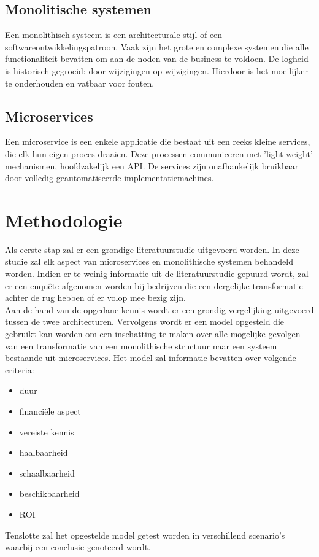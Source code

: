 \subsection{Monolitische systemen}
Een monolithisch systeem is een architecturale stijl of een softwareontwikkelingspatroon. Vaak zijn het grote en complexe systemen die alle functionaliteit bevatten om aan de noden van de business te voldoen. De logheid is historisch gegroeid: door wijzigingen op wijzigingen. Hierdoor is het moeilijker te onderhouden en vatbaar voor fouten.
~\autocite{Monolith2014}

\subsection{Microservices}
Een microservice is een enkele applicatie die bestaat uit een reeks kleine services, die elk hun eigen proces draaien. Deze processen communiceren met 'light-weight' mechanismen, hoofdzakelijk een API. De services zijn onafhankelijk bruikbaar door volledig geautomatiseerde implementatiemachines. 
~\autocite{Microservices2014}

\section{Methodologie}
\label{sec:methodologie}

Als eerste stap zal er een grondige literatuurstudie uitgevoerd worden. In deze studie zal elk aspect van microservices en monolithische systemen behandeld worden.  
Indien er te weinig informatie uit de literatuurstudie gepuurd wordt, zal er een enquête afgenomen worden bij bedrijven die een dergelijke transformatie achter de rug hebben of er volop mee bezig zijn.\\
Aan de hand van de opgedane kennis wordt er een grondig vergelijking uitgevoerd tussen de twee architecturen. Vervolgens wordt er een model opgesteld die gebruikt kan worden om een inschatting te maken over alle mogelijke gevolgen van een transformatie van een monolithische structuur naar een systeem bestaande uit microservices. Het model zal informatie bevatten over volgende criteria:
\begin{itemize}
    \item duur
    \item financiële aspect
    \item vereiste kennis
    \item haalbaarheid
    \item schaalbaarheid
    \item beschikbaarheid
    \item ROI
\end{itemize} 
Tenslotte zal het opgestelde model getest worden in verschillend scenario’s waarbij een conclusie genoteerd wordt.

